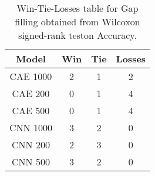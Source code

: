 \begin{table}[H]
\centering
\begin{tabular}{|c|c|c|c|}

\textbf{Model} &  \textbf{Win} &  \textbf{Tie} &  \textbf{Losses} \\
\hline

      CAE 1000 &             2 &             1 &                2 \\
\hline
       CAE 200 &             0 &             1 &                4 \\
\hline
       CAE 500 &             0 &             1 &                4 \\
\hline
      CNN 1000 &             3 &             2 &                0 \\
\hline
       CNN 200 &             2 &             3 &                0 \\
\hline
       CNN 500 &             3 &             2 &                0 \\
\hline

\end{tabular}
\caption{Win-Tie-Losses table for Gap filling obtained from Wilcoxon signed-rank teston Accuracy.}
\label{tab:gap_filling_model_comparison}
\end{table}
